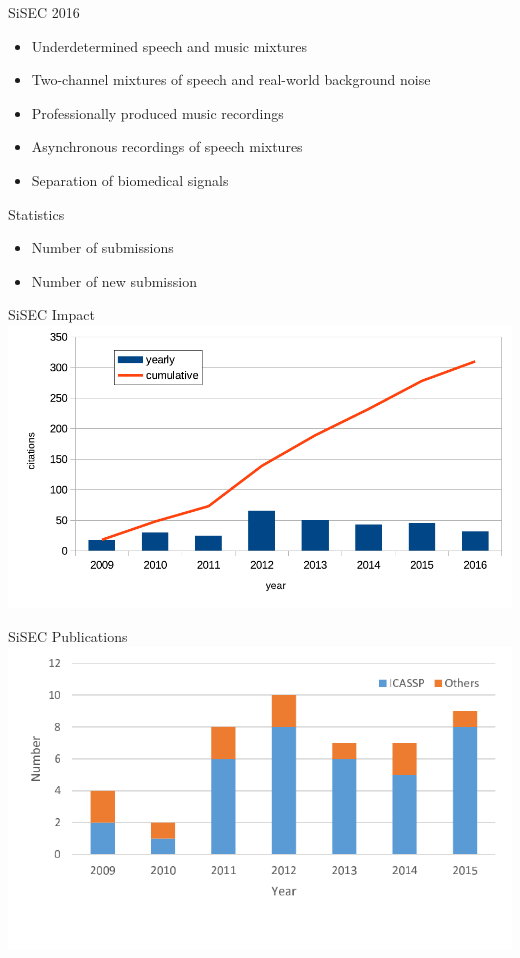 \documentclass{beamer}
\begin{document}
\begin{frame}{SiSEC 2016}

\begin{itemize}

\item
  Underdetermined speech and music mixtures
\item
  Two-channel mixtures of speech and real-world background noise
\item
  Professionally produced music recordings
\item
  Asynchronous recordings of speech mixtures
\item
  Separation of biomedical signals
\end{itemize}

\end{frame}

\begin{frame}{Statistics}

\begin{itemize}

\item
  Number of submissions
\item
  Number of new submission
\end{itemize}

\end{frame}

\begin{frame}{SiSEC Impact}
\includegraphics[width=\textwidth]{fig/SiSEC_impact-eps-converted-to.pdf}
\end{frame}

\begin{frame}{SiSEC Publications}
\includegraphics[width=\textwidth]{fig/SiSEC_pub-eps-converted-to.pdf}
\end{frame}
\end{document}
